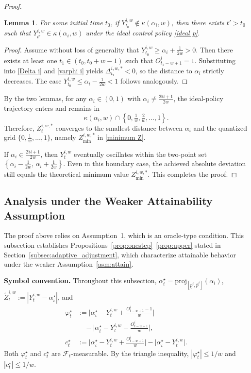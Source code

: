 \documentclass[a4paper,fleqn]{cas-dc}
\theoremstyle{plain}
\newtheorem{lemma}{Lemma}
\theoremstyle{remark}
\theoremstyle{plain}
\begin{document}
\begin{proof}
\begin{lemma}
For some initial time $t_0$, if $Y_{t_0}^{i,w} \notin \kappa(\alpha_i,w)$, then there exists $t' > t_0$ such that $Y_{t'}^{i,w} \in \kappa(\alpha_i,w)$ under the ideal control policy \eqref{ideal p}.
\end{lemma}
\begin{proof}
Assume without loss of generality that $Y_{t_0}^{i,w} \ge \alpha_i + \frac{1}{2w} > 0$. Then there exists at least one $t_1 \in (t_0, t_0 + w - 1)$ such that $O_{t_1 - w + 1}^{i} = 1$. Substituting into \eqref{Delta i} and \eqref{varphi i} yields $\Delta_{t_1}^{i,w,*} < 0$, so the distance to $\alpha_i$ strictly decreases. The case $Y_{t_0}^{i,w} \le \alpha_i - \frac{1}{2w} < 1$ follows analogously.
\end{proof}

By the two lemmas, for any $\alpha_i \in (0,1)$ with $\alpha_i \neq \frac{2\mathbb{N}+1}{2w}$, the ideal-policy trajectory enters and remains in
\begin{equation*}
    \kappa(\alpha_i,w) \cap \left\{0,\tfrac{1}{w},\tfrac{2}{w},\dots,1\right\}.
\end{equation*}
Therefore, $Z_t^{i,w,*}$ converges to the smallest distance between $\alpha_i$ and the quantized grid $\{0,\tfrac{1}{w},\ldots,1\}$, namely $Z_{\min}^{i,w,*}$ in \eqref{minimum Z}.

If $\alpha_i \in \frac{2\mathbb{N}+1}{2w}$, then $Y_t^{i,w}$ eventually oscillates within the two-point set $\left\{\alpha_i - \tfrac{1}{2w},\, \alpha_i + \tfrac{1}{2w}\right\}$. Even in this boundary case, the achieved absolute deviation still equals the theoretical minimum value $Z_{\min}^{i,w,*}$. This completes the proof.
\end{proof}

\subsection{Analysis under the Weaker Attainability Assumption}\label{subsec:weak}

The proof above relies on Assumption~1, which is an oracle-type condition. This subsection establishes Propositions~\ref{prop:onestep}--\ref{prop:upper} stated in Section~\ref{subsec:adaptive_adjustment}, which characterize attainable behavior under the weaker Assumption~\ref{asm:attain}.

\noindent\textbf{Symbol convention.} Throughout this subsection, $\alpha_i^\star=\mathrm{proj}_{[\underline p^i,\overline p^i]}(\alpha_i)$, $\tilde Z_t^{i,w}:=|Y_t^{i,w}-\alpha_i^\star|$, and
\begin{align*}
\varphi_t^\star &:= \big|\alpha_i^\star-Y_t^{i,w}+\tfrac{O_{t-w+1}^i-1}{w}\big|\\&\quad-\big|\alpha_i^\star-Y_t^{i,w}+\tfrac{O_{t-w+1}^i}{w}\big|,\\
c_t^\star &:= \big|\alpha_i^\star-Y_t^{i,w}+\tfrac{O_{t-w+1}^i}{w}\big|-\big|\alpha_i^\star-Y_t^{i,w}\big|.
\end{align*}
Both $\varphi_t^\star$ and $c_t^\star$ are $\mathcal{F}_t$-measurable. By the triangle inequality, $|\varphi_t^\star|\le 1/w$ and $|c_t^\star|\le 1/w$.
\end{document}
